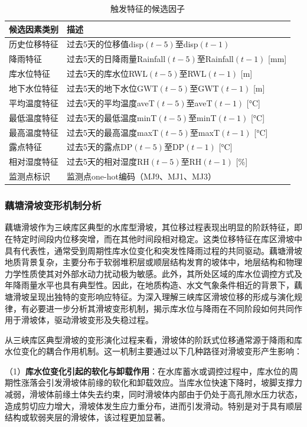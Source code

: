 \documentclass[12pt,a4paper]{article}
\newcommand{\tabcaption}[2]{%
  \caption[#1]{{\CJKfamily{songbold}#1}}}
\begin{document}
\begin{table}[htbp]
\centering
\tabcaption{触发特征的候选因子}{Candidate Triggering Features for Landslide Displacement}
\label{tab:candidate_features}
\begin{tabular}{ll}
\toprule
候选因素类别 & 描述 \\
\midrule
历史位移特征 & 过去5天的位移值disp$(t-5)$至disp$(t-1)$ \\
降雨特征 & 过去5天的日降雨量Rainfall$(t-5)$至Rainfall$(t-1)$ [mm] \\
库水位特征 & 过去5天的库水位RWL$(t-5)$至RWL$(t-1)$ [m] \\
地下水位特征 & 过去5天的地下水位GWT$(t-5)$至GWT$(t-1)$ [m] \\
平均温度特征 & 过去5天的平均温度aveT$(t-5)$至aveT$(t-1)$ [°C] \\
最低温度特征 & 过去5天的最低温度minT$(t-5)$至minT$(t-1)$ [°C] \\
最高温度特征 & 过去5天的最高温度maxT$(t-5)$至maxT$(t-1)$ [°C] \\
露点特征 & 过去5天的露点DP$(t-5)$至DP$(t-1)$ [°C] \\
相对湿度特征 & 过去5天的相对湿度RH$(t-5)$至RH$(t-1)$ [\%] \\
监测点标识 & 监测点one-hot编码（MJ9、MJ1、MJ3） \\
\bottomrule
\end{tabular}
\end{table}

\subsubsection{藕塘滑坡变形机制分析}

藕塘滑坡作为三峡库区典型的水库型滑坡，其位移过程表现出明显的阶跃特征，即在特定时间段内位移突增，而在其他时间段相对稳定。这类位移特征在库区滑坡中具有代表性，通常受到周期性库水位变化和突发性降雨过程的共同驱动。藕塘滑坡地质背景复杂，主要分布于软弱堆积层或顺层结构发育的坡体中，地层结构和物理力学性质使其对外部水动力扰动极为敏感。此外，其所处区域的库水位调控方式及年降雨量水平也具有典型性。因此，在地质构造、水文气象条件相近的背景下，藕塘滑坡呈现出独特的变形响应特征。为深入理解三峡库区滑坡位移的形成与演化规律，有必要进一步分析其滑坡变形机制，揭示库水位与降雨在不同阶段如何共同作用于滑坡体，驱动滑坡变形及失稳过程。

从三峡库区典型滑坡的变形演化过程来看，滑坡体的阶跃式位移通常源于降雨和库水位变化的耦合作用机制。这一机制主要通过以下几种路径对滑坡变形产生影响：

    （1）\textbf{库水位变化引起的软化与卸载作用}：在水库蓄水或调控过程中，库水位的周期性涨落会引发滑坡体前缘的软化和卸载效应。当库水位快速下降时，坡脚支撑力减弱，滑坡体前缘土体失去约束，同时滑坡体内部由于仍处于高孔隙水压力状态，造成剪切应力增大，滑坡体发生应力重分布，进而引发滑动。特别是对于具有顺层结构或软弱夹层的滑坡体，该过程更加显著。
\end{document}
